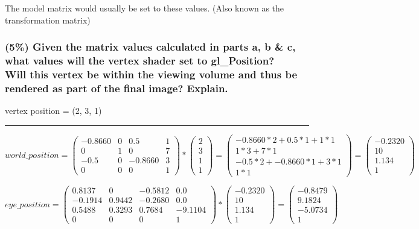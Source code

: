 The model matrix would usually be set to these values. (Also known as the transformation matrix)

\subsubsection{(5\%) Given the matrix values calculated in parts a, b \& c, what values will the vertex shader set to gl\_Position? \\
Will this vertex be within the viewing volume and thus be rendered as part of the final image? Explain.}

vertex position = (2, 3, 1)

\rule{\textwidth}{0.1mm}

$
    world\_position
=
    \left(\begin{array}{cccc}
        -0.8660 & 0 & 0.5     & 1 \\
        0       & 1 & 0       & 7 \\
        -0.5    & 0 & -0.8660 & 3 \\
        0       & 0 & 0       & 1
    \end{array}\right)
    *
    \left(\begin{array}{c}
        2\\3\\1\\1
    \end{array}\right)
=
    \left(\begin{array}{c}
        -0.8660 * 2 + 0.5 * 1 + 1 * 1\\
        1 * 3 + 7 * 1\\
        -0.5 * 2 + -0.8660 * 1 + 3 * 1\\
        1 * 1
    \end{array}\right)
=
    \left(\begin{array}{c}
        -0.2320\\
        10\\
        1.134\\
        1
    \end{array}\right)
$

$
    eye\_position
=
    \left(\begin{array}{cccc}
        0.8137 & 0      & -0.5812 &  0.0 \\
        -0.1914 & 0.9442 & -0.2680 &  0.0 \\
        0.5488 & 0.3293 &  0.7684 & -9.1104 \\
        0 & 0 & 0 & 1
    \end{array}\right)
    *
    \left(\begin{array}{c}
        -0.2320\\
        10\\
        1.134\\
        1
    \end{array}\right)
=
    \left(\begin{array}{c}
        -0.8479\\
        9.1824\\
        -5.0734\\
        1        
    \end{array}\right)
$

